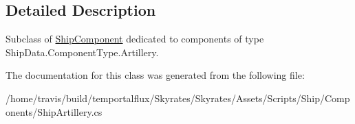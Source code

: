 \subsection{Detailed Description}
Subclass of \hyperlink{class_skyrates_1_1_ship_1_1_ship_component}{Ship\-Component} dedicated to components of type Ship\-Data.\-Component\-Type.\-Artillery. 



The documentation for this class was generated from the following file\-:\begin{DoxyCompactItemize}
\item 
/home/travis/build/temportalflux/\-Skyrates/\-Skyrates/\-Assets/\-Scripts/\-Ship/\-Components/Ship\-Artillery.\-cs\end{DoxyCompactItemize}
